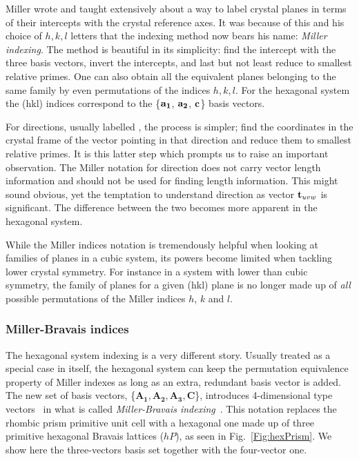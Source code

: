 Miller wrote and taught extensively about a way to label crystal planes in terms of their intercepts with the crystal reference axes. It was because of this and his choice of $h,k,l$ letters that the indexing method now bears his name: \textit{Miller indexing}. The method is beautiful in its simplicity: find the intercept with the three basis vectors, invert the intercepts, and last but not least reduce to smallest relative primes. One can also obtain all the equivalent planes belonging to the same family by even permutations of the indices $h,k,l$. For the hexagonal system the \hkl(hkl) indices correspond to the \{$\vb{a_1}$, $\vb{a_2}$, $\vb{c}$\} basis vectors.

\label{disc:millervector}
For directions, usually labelled \hkl[uvw], the process is simpler; find the coordinates in the crystal frame of the vector pointing in that direction and reduce them to smallest relative primes. It is this latter step which prompts us to raise an important observation. The Miller notation for direction does not carry vector length information and should not be used for finding length information. This might sound obvious, yet the temptation to understand direction \hkl[uvw] as vector $\vb{t}_{uvw}$ is significant. The difference between the two becomes more apparent in the hexagonal system.


While the Miller indices notation is tremendously helpful when looking at families of planes in a cubic system, its powers become limited when tackling lower crystal symmetry. For instance in a system with lower than cubic symmetry, the family of planes for a given \hkl(hkl) plane is no longer made up of \emph{all} possible permutations of the Miller indices $h$, $k$ and $l$.

\subsubsection{Miller-Bravais indices}
\label{subChap:MB indices}

The hexagonal system indexing is a very different story. Usually treated as a special case in itself, the hexagonal system can keep the permutation equivalence property of Miller indexes as long as an extra, redundant basis vector is added. The new set of basis vectors, \{$\mathbf{A_1},\mathbf{A_2}, \mathbf{A_3}, \mathbf{C} $\}, introduces 4-dimensional type vectors~\cite{Frank65} in what is called \textit{Miller-Bravais indexing}~\cite{Nicholas66}. This notation replaces the rhombic prism primitive unit cell with a hexagonal one  made up of three primitive hexagonal Bravais lattices ($hP$), as seen in Fig.~\ref{Fig:hexPrism}. We show here the three-vectors basis set together with the four-vector one.


